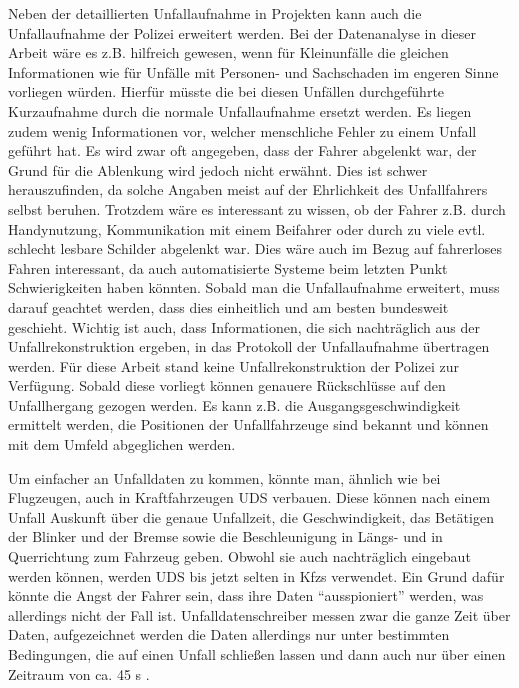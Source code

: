 Neben der detaillierten Unfallaufnahme in Projekten kann auch die Unfallaufnahme der Polizei erweitert werden. Bei der Datenanalyse in dieser Arbeit wäre es z.B. hilfreich gewesen, wenn für Kleinunfälle die gleichen Informationen wie für Unfälle mit Personen- und Sachschaden im engeren Sinne vorliegen würden. Hierfür müsste die bei diesen Unfällen durchgeführte Kurzaufnahme durch die normale Unfallaufnahme ersetzt werden. Es liegen zudem wenig Informationen vor, welcher menschliche Fehler zu einem Unfall geführt hat. Es wird zwar oft angegeben, dass der Fahrer abgelenkt war, der Grund für die Ablenkung wird jedoch nicht erwähnt. Dies ist schwer herauszufinden, da solche Angaben meist auf der Ehrlichkeit des Unfallfahrers selbst beruhen. Trotzdem wäre es interessant zu wissen, ob der Fahrer z.B. durch Handynutzung, Kommunikation mit einem Beifahrer oder durch zu viele evtl. schlecht lesbare Schilder abgelenkt war. Dies wäre auch im Bezug auf fahrerloses Fahren interessant, da auch automatisierte Systeme beim letzten Punkt Schwierigkeiten haben könnten. Sobald man die Unfallaufnahme erweitert, muss darauf geachtet werden, dass dies einheitlich und am besten bundesweit geschieht. Wichtig ist auch, dass Informationen, die sich nachträglich aus der Unfallrekonstruktion ergeben, in das Protokoll der Unfallaufnahme übertragen werden. Für diese Arbeit stand keine Unfallrekonstruktion der Polizei zur Verfügung. Sobald diese vorliegt können genauere Rückschlüsse auf den Unfallhergang gezogen werden. Es kann z.B. die Ausgangsgeschwindigkeit ermittelt werden, die Positionen der Unfallfahrzeuge sind bekannt und können mit dem Umfeld abgeglichen werden.

Um einfacher an Unfalldaten zu kommen, könnte man, ähnlich wie bei Flugzeugen, auch in Kraftfahrzeugen \ac{UDS} verbauen. Diese können nach einem Unfall Auskunft über die genaue Unfallzeit, die Geschwindigkeit, das Betätigen der Blinker und der Bremse sowie die Beschleunigung in Längs- und in Querrichtung zum Fahrzeug geben. Obwohl sie auch nachträglich eingebaut werden können, werden \ac{UDS} bis jetzt selten in Kfzs verwendet. Ein Grund dafür könnte die Angst der Fahrer sein, dass ihre Daten \enquote{ausspioniert} werden, was allerdings nicht der Fall ist. Unfalldatenschreiber messen zwar die ganze Zeit über Daten, aufgezeichnet werden die Daten allerdings nur unter bestimmten Bedingungen, die auf einen Unfall schließen lassen und dann auch nur über einen Zeitraum von ca. 45 s \parencite[S. 99]{Burg.2017}.

